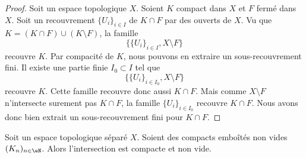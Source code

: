 \begin{proof}
	Soit un espace topologique \( X\). Soient \( K\) compact dans \( X\) et \( F\) fermé dans \( X\). Soit un recouvrement \( \{ U_i \}_{i\in I}\) de \( K\cap F\) par des ouverts de \( X\). Vu que \( K=(K\cap F)\cup (K\setminus F)\), la famille
	\begin{equation}
		\big\{ \{ U_i \}_{i\in I},X\setminus F \big\}
	\end{equation}
	recouvre \( K\). Par compacité de \( K\), nous pouvons en extraire un sous-recouvrement fini. Il existe une partie finie \( I_0\subset I\) tel que
	\begin{equation}
		\big\{ \{ U_i \}_{i\in I_0},X\setminus F \big\}
	\end{equation}
	recouvre \( K\). Cette famille recouvre donc aussi \( K\cap F\). Mais comme \( X\setminus F\) n'intersecte surement pas \( K\cap F\), la famille \( \{ U_i \}_{i\in I_0}\) recouvre \( K\cap F\). Nous avons donc bien extrait un sous-recouvrement fini pour \( K\cap F\).
\end{proof}


\begin{proposition}	\label{PROPooFXCXooXNeXWl}
	Soit un espace topologique séparé \( X\). Soient des compacts emboîtés non vides \( (K_n)_{n\in \eN}\). Alors l'intersection est compacte et non vide.
\end{proposition}

